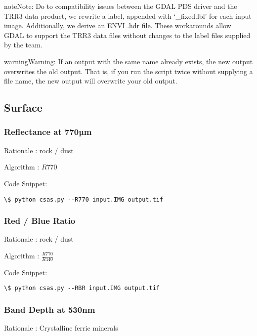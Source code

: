 \documentclass[letterpaper,10pt,english]{sphinxmanual}
\begin{document}
\begin{notice}{note}{Note:}
Do to compatibility issues between the GDAL PDS driver and the TRR3 data product, we rewrite a label, appended with `\_fixed.lbl' for each input image.  Additionally, we derive an ENVI .hdr file.  These workarounds allow GDAL to support the TRR3 data files without changes to the label files supplied by the team.
\end{notice}

\begin{notice}{warning}{Warning:}
If an output with the same name already exists, the new output overwrites the old output.  That is, if you run the script twice without supplying a file name, the new output will overwrite your old output.
\end{notice}


\subsection{Surface}
\label{Algorithms:id2}\label{Algorithms:surface}

\subsubsection{Reflectance at 770µm}
\label{Algorithms:reflectance-at-770m}
Rationale : rock / dust

Algorithm : $R770$

Code Snippet:

\begin{Verbatim}[commandchars=\\\{\}]
\$ python csas.py --R770 input.IMG output.tif
\end{Verbatim}


\subsubsection{Red / Blue Ratio}
\label{Algorithms:red-blue-ratio}
Rationale : rock / dust

Algorithm : $\frac{R770}{R440}$

Code Snippet:

\begin{Verbatim}[commandchars=\\\{\}]
\$ python csas.py --RBR input.IMG output.tif
\end{Verbatim}


\subsubsection{Band Depth at 530nm}
\label{Algorithms:band-depth-at-530nm}
Rationale : Crystalline ferric minerals
\end{document}
